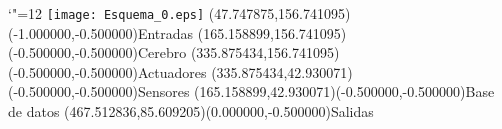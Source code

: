 \documentclass[12pt]{article}
\begin{document}
\makeatletter%
\let\ASYencoding\f@encoding%
\let\ASYfamily\f@family%
\let\ASYseries\f@series%
\let\ASYshape\f@shape%
\makeatother%
{\catcode`"=12%
\texttt{[image: Esquema\_0.eps]}%
}%
\kern -504.981641pt%
\color{ASYcolor}
\fontsize{12.000000}{14.400000}\selectfont
\usefont{\ASYencoding}{\ASYfamily}{\ASYseries}{\ASYshape}%
\ASYalign(47.747875,156.741095)(-1.000000,-0.500000){Entradas}%
\color{ASYcolor}
\fontsize{12.000000}{14.400000}\selectfont
\ASYalign(165.158899,156.741095)(-0.500000,-0.500000){Cerebro}%
\color{ASYcolor}
\fontsize{12.000000}{14.400000}\selectfont
\ASYalign(335.875434,156.741095)(-0.500000,-0.500000){Actuadores}%
\color{ASYcolor}
\fontsize{12.000000}{14.400000}\selectfont
\ASYalign(335.875434,42.930071)(-0.500000,-0.500000){Sensores}%
\color{ASYcolor}
\fontsize{12.000000}{14.400000}\selectfont
\ASYalign(165.158899,42.930071)(-0.500000,-0.500000){Base de datos}%
\color{ASYcolor}
\fontsize{12.000000}{14.400000}\selectfont
\ASYalign(467.512836,85.609205)(0.000000,-0.500000){Salidas}%
\end{document}
